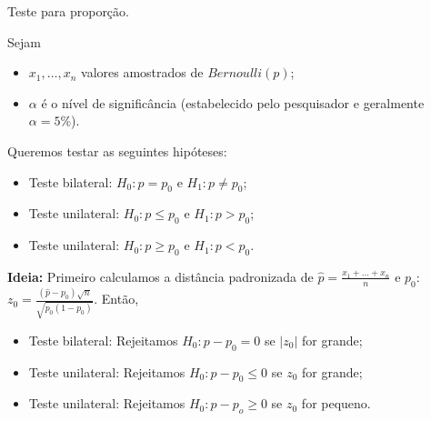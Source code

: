 \documentclass[8pt]{beamer}
\begin{document}
\begin{frame}{Teste para proporção.}

\normalsize

Sejam
\begin{itemize}
	\item $x_1, \dots, x_n$ valores amostrados de $Bernoulli(p)$;
	\item $\alpha$ é o nível de significância (estabelecido pelo pesquisador e geralmente $\alpha=5\%$). 
\end{itemize}
\vfill

Queremos testar as seguintes hipóteses:
\begin{itemize}
	\item Teste bilateral: $H_0: p= p_0$ e $H_1: p \neq p_0$;
	\item Teste unilateral: $H_0: p \leq p_0$ e $H_1: p > p_0$;
	\item Teste unilateral: $H_0: p \geq p_0$ e $H_1: p < p_0$.
\end{itemize}
\vfill

\textbf{Ideia:} Primeiro calculamos a distância padronizada de $\hat{p} = \frac{x_1 + \dots + x_n}{n}$ e $p_0$: $z_0=\frac{(\hat{p} - p_0)\sqrt{n}}{\sqrt{p_0 (1-p_0)}}$. Então, 
\begin{itemize}
	\item Teste bilateral: Rejeitamos $H_0: p - p_0 = 0$ se $\lvert z_0 \rvert$ for grande;
	\item Teste unilateral: Rejeitamos $H_0: p - p_0 \leq 0$ se $z_0$ for grande;
	\item Teste unilateral: Rejeitamos $H_0: p - p_o \geq 0$ se $z_0$ for pequeno.
\end{itemize}

\end{frame}
\end{document}
